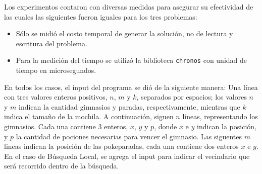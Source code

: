 Los experimentos contaron con diversas medidas para asegurar su efectividad de
las cuales las siguientes fueron iguales para los tres problemas:
\begin{itemize}
	\item{Sólo se midió el costo temporal de generar la solución, no
			de lectura y escritura del problema.}
	\item{Para la medición del tiempo se utilizó la biblioteca \texttt{chronos}
			con unidad de tiempo en microsegundos.}
\end{itemize}


En todos los casos, el input del programa se dió de la siguiente manera:
Una línea con tres valores enteros positivos, $n$, $m$ y $k$, separados por espacios; los valores $n$ y $m$ indican la cantidad gimnasios y paradas, respectivamente, mientras que $k$ indica el tamaño de la mochila. A continuación, siguen $n$ líneas, representando los gimnasios. Cada una contiene 3 enteros, $x$, $y$ y $p$, donde $x$ e $y$ indican la posición, y $p$ la cantidad de pociones necesarias para vencer el gimnasio. Las siguentes $m$ lineas indican la posición de las pokeparadas, cada una contiene dos enteros $x$ e $y$. En el caso de Búsqueda Local, se agrega el input para indicar el vecindario que será recorrido dentro de la búsqueda.